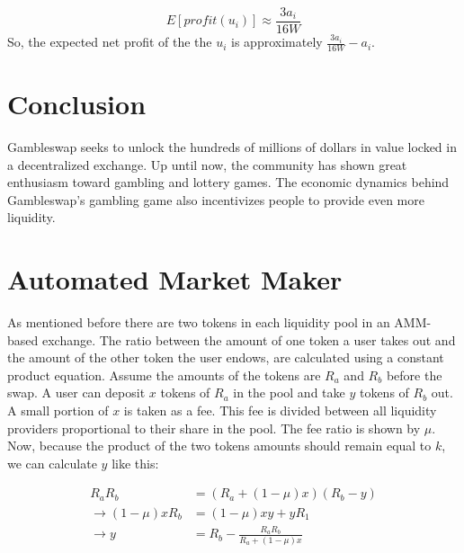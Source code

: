 \documentclass{article}
\begin{document}
$$
E[profit(u_i)] \approx \frac{3a_i}{16W}
$$
So, the expected net profit of the the $u_i$ is approximately
$
\frac{3a_i}{16W} - a_i
$.

\section{Conclusion}
Gambleswap seeks to unlock the hundreds of millions of dollars in value locked in a decentralized exchange. Up until now, the community has shown great enthusiasm toward gambling and lottery games. The economic dynamics behind Gambleswap's gambling game also incentivizes people to provide even more liquidity.

\pagebreak
\appendix
\label{app:amm}
\section{Automated Market Maker}
As mentioned before there are two tokens in each liquidity pool in an AMM-based exchange. The ratio between the amount of one token a user takes out and the amount of the other token the user endows, are calculated using a constant product equation. 
Assume the amounts of the tokens are $R_a$ and $R_b$ before the swap. A user can deposit $x$ tokens of $R_a$ in the pool and take $y$ tokens of $R_b$ out. 
A small portion of $x$ is taken as a fee. This fee is divided between all liquidity providers proportional to their share in the pool. The fee ratio is shown by $\mu$. Now, because the product of the two tokens amounts should remain equal to $k$, we can calculate $y$ like this:

\begin{align*}
    R_a R_b &= (R_a + (1 - \mu)x)(R_b - y) \\
    \to (1 - \mu)xR_b &= (1 - \mu)xy + yR_1 \\
    \to y &= R_b - \frac{R_aR_b}{R_a + (1 - \mu)x}
\end{align*}
\end{document}

